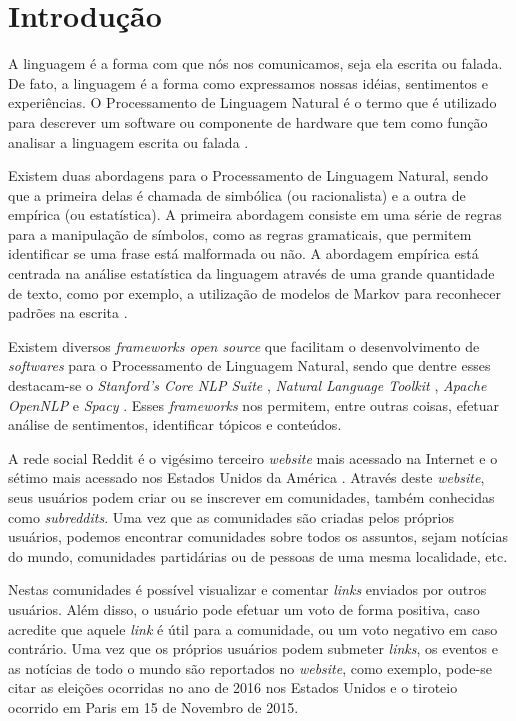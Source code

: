 \chapter{Introdução}
\label{chap:introducao}
A linguagem é a forma com que nós nos comunicamos, seja ela escrita ou
falada. De fato, a linguagem é a forma como
expressamos nossas idéias, sentimentos e experiências. O Processamento de
Linguagem Natural é o termo que é utilizado para descrever um software ou
componente de hardware que tem como função analisar a linguagem escrita ou falada
\cite{jacksonmoulinier2007}.

Existem duas abordagens para o Processamento de Linguagem Natural, sendo que a
primeira delas é chamada de simbólica (ou racionalista) e a outra de empírica
(ou estatística).
A primeira abordagem consiste em uma série de regras para a manipulação de
símbolos, como as regras gramaticais, que permitem identificar se uma frase está
malformada ou não. A abordagem empírica está centrada na análise estatística da
linguagem através de uma grande quantidade de texto, como por exemplo, a
utilização de modelos de Markov para reconhecer padrões na escrita \cite{jacksonmoulinier2007}.

Existem diversos \textit{frameworks open source} que facilitam o desenvolvimento
de \textit{softwares} para o Processamento de Linguagem Natural, sendo que
dentre esses destacam-se o \textit{Stanford's Core NLP Suite} \cite{corenlp},
\textit{Natural Language Toolkit} \cite{nltk}, \textit{Apache OpenNLP} \cite{opennlp} e \textit{Spacy}
\cite{spacy}.
Esses \textit{frameworks} nos permitem, entre outras coisas, efetuar análise de
sentimentos, identificar tópicos e conteúdos.

A rede social Reddit é o vigésimo terceiro \textit{website} mais acessado na
Internet e o sétimo mais acessado nos Estados Unidos da América \cite{alexa}.
Através deste \textit{website}, seus usuários podem criar ou se inscrever em
comunidades, também conhecidas como \textit{subreddits}.
Uma vez que as comunidades são criadas pelos próprios usuários, podemos encontrar
comunidades sobre todos os assuntos, sejam notícias do mundo, comunidades
partidárias ou de pessoas de uma mesma localidade, etc.

Nestas comunidades é possível visualizar e comentar \textit{links} enviados por
outros usuários.
Além disso, o usuário pode efetuar um voto de forma positiva, caso acredite que
aquele \textit{link} é útil para a comunidade, ou um voto negativo em caso
contrário.
Uma vez que os próprios usuários podem submeter \textit{links}, os eventos e as
notícias de todo o mundo são reportados no \textit{website}, como exemplo,
pode-se citar as eleições ocorridas no ano de 2016 nos Estados Unidos e o
tiroteio ocorrido em Paris em 15 de Novembro de 2015.

